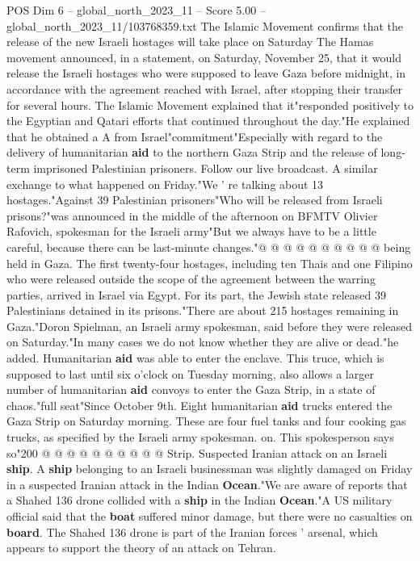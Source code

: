 \begin{textsample}{POS Dim 6 – global\_north\_2023\_11 – Score 5.00 – global\_north\_2023\_11/103768359.txt}  \label{ex:f6_pos_214}
The Islamic Movement confirms that the release of the new Israeli hostages will take place on Saturday The Hamas movement announced, in a statement, on Saturday, November 25, that it would release the Israeli hostages who were supposed to leave Gaza before midnight, in accordance with the agreement reached with Israel, after stopping their transfer for several hours.
The Islamic Movement explained that it"responded positively to the Egyptian and Qatari efforts that continued throughout the day."He explained that he obtained a A from Israel"commitment"Especially with regard to the delivery of humanitarian \textbf{aid} to the northern Gaza Strip and the release of long-term imprisoned Palestinian prisoners.
Follow our live broadcast.
A similar exchange to what happened on Friday."We ' re talking about 13 hostages."Against 39 Palestinian prisoners"Who will be released from Israeli prisons?"was announced in the middle of the afternoon on BFMTV Olivier Rafovich, spokesman for the Israeli army"But we always have to be a little careful, because there can be last-minute changes."@ @ @ @ @ @ @ @ @ @ being held in Gaza.
The first twenty-four hostages, including ten Thais and one Filipino who were released outside the scope of the agreement between the warring parties, arrived in Israel via Egypt.
For its part, the Jewish state released 39 Palestinians detained in its prisons."There are about 215 hostages remaining in Gaza."Doron Spielman, an Israeli army spokesman, said before they were released on Saturday."In many cases we do not know whether they are alive or dead."he added.
Humanitarian \textbf{aid} was able to enter the enclave.
This truce, which is supposed to last until six o'clock on Tuesday morning, also allows a larger number of humanitarian \textbf{aid} convoys to enter the Gaza Strip, in a state of chaos."full seat"Since October 9th.
Eight humanitarian \textbf{aid} trucks entered the Gaza Strip on Saturday morning.
These are four fuel tanks and four cooking gas trucks, as specified by the Israeli army spokesman. on.
This spokesperson says so"200 @ @ @ @ @ @ @ @ @ @ Strip.
Suspected Iranian attack on an Israeli \textbf{ship}.
A \textbf{ship} belonging to an Israeli businessman was slightly damaged on Friday in a suspected Iranian attack in the Indian \textbf{Ocean}."We are aware of reports that a Shahed 136 drone collided with a \textbf{ship} in the Indian \textbf{Ocean}."A US military official said that the \textbf{boat} suffered minor damage, but there were no casualties on \textbf{board}.
The Shahed 136 drone is part of the Iranian forces ' arsenal, which appears to support the theory of an attack on Tehran.

\end{textsample}
